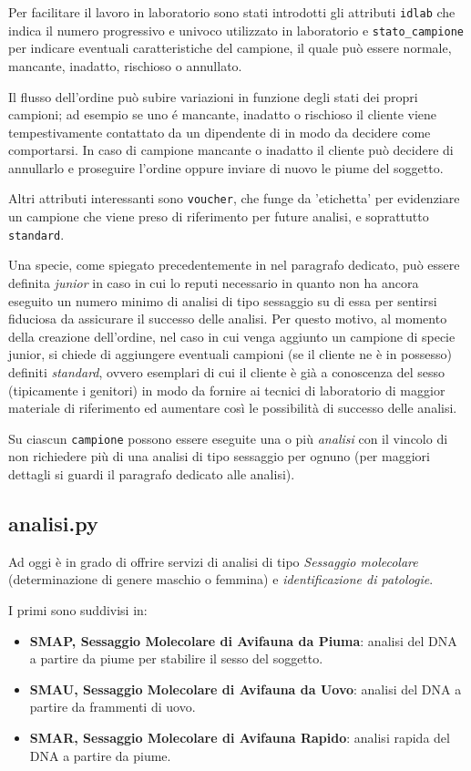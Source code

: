 Per facilitare il lavoro in laboratorio sono stati introdotti gli attributi \texttt{idlab} che indica il numero progressivo e univoco utilizzato in laboratorio e \texttt{stato\_campione} per indicare eventuali caratteristiche del campione, il quale può essere normale, mancante, inadatto, rischioso o annullato. 

Il flusso dell'ordine può subire variazioni in funzione degli stati dei propri campioni; ad esempio se uno é mancante, inadatto o rischioso il cliente viene tempestivamente contattato da un dipendente di {\fem} in modo da decidere come comportarsi. In caso di campione mancante o inadatto il cliente può decidere di annullarlo e proseguire l'ordine oppure inviare di nuovo le piume del soggetto.

Altri attributi interessanti sono \texttt{voucher}, che funge da 'etichetta' per evidenziare un campione che viene preso di riferimento per future analisi, e soprattutto \texttt{standard}.

Una specie, come spiegato precedentemente in nel paragrafo dedicato, può essere definita \emph{junior} in caso in cui {\fem} lo reputi necessario in quanto non ha ancora eseguito un numero minimo di analisi di tipo sessaggio su di essa per sentirsi fiduciosa da assicurare il successo delle analisi. Per questo motivo, al momento della creazione dell'ordine, nel caso in cui venga aggiunto un campione di specie junior, si chiede di aggiungere eventuali campioni (se il cliente ne è in possesso) definiti \emph{standard}, ovvero esemplari di cui il cliente è già a conoscenza del sesso (tipicamente i genitori) in modo da fornire ai tecnici di laboratorio di {\fem} maggior materiale di riferimento ed aumentare così le possibilità di successo delle analisi.

Su ciascun \texttt{campione} possono essere eseguite una o più \emph{analisi} con il vincolo di non richiedere più di una analisi di tipo sessaggio per ognuno (per maggiori dettagli si guardi il paragrafo dedicato alle analisi).

\subsection*{analisi.py}
\label{subs:analisi}
Ad oggi {\fem} è in grado di offrire servizi di analisi di tipo \emph{Sessaggio molecolare} (determinazione di genere maschio o femmina) e \emph{identificazione di patologie}.

I primi sono suddivisi in:
\begin{itemize}
 \item \textbf{SMAP, Sessaggio Molecolare di Avifauna da Piuma}: analisi del DNA a partire da piume per stabilire il sesso del soggetto.
 \item \textbf{SMAU, Sessaggio Molecolare di Avifauna da Uovo}: analisi del DNA a partire da frammenti di uovo.
 \item \textbf{SMAR, Sessaggio Molecolare di Avifauna Rapido}: analisi rapida del DNA a partire da piume.
\end{itemize}

